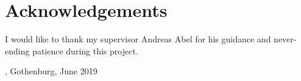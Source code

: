 \thispagestyle{plain}			%

\section*{Acknowledgements}
	I would like to thank my supervisor Andreas Abel for his guidance and
	never-ending patience during this project.

\vspace{1.5cm}
\hfill
\me, Gothenburg, June 2019

\newpage				%
\thispagestyle{empty}
\mbox{}

